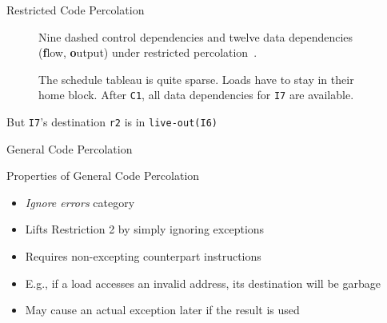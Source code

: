 \documentclass[presentation]{beamer}
\begin{document}
\begin{frame}{Restricted Code Percolation}
    \begin{center}
    \begin{minipage}{.52\textwidth}
        \begin{figure}[H]
            \centering
            
            \caption{Nine dashed control dependencies and twelve data dependencies (\textbf{f}low, \textbf{o}utput) under restricted percolation~\cite{chang95}.}
            \label{fig:restric_cfg}
\end{figure}
    \end{minipage}\hfill
    \begin{minipage}{.46\textwidth}
    \begin{figure}[H]
            \centering
            \resizebox{1\textwidth}{!}{
            
        }
        \caption{The schedule tableau is quite sparse. Loads have to stay in their home block. After \texttt{C1}, all data dependencies for \texttt{I7} are available.}
        \label{fig:restricted_motion}
\end{figure}
    \end{minipage}
\end{center} 
\end{frame}

\begin{frame}{But \texttt{I7}'s destination \texttt{r2} is in \texttt{live-out(I6)}}
    
\end{frame}


\begin{frame}{General Code Percolation}
    \begin{block}{Properties of General Code Percolation}
        \begin{itemize}
            \item \textit{Ignore errors} category
            \item Lifts Restriction 2 by simply ignoring exceptions
            \item Requires non-excepting counterpart instructions
        \end{itemize}
    \end{block}
    \begin{itemize}
        \item E.g., if a load accesses an invalid address, its destination will be garbage
        \item May cause an actual exception later if the result is used
    \end{itemize}
\end{frame}
\end{document}

